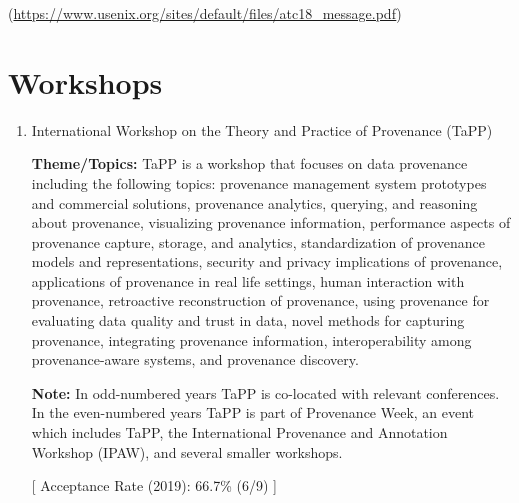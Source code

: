 \begin{enumerate}

(\url{https://www.usenix.org/sites/default/files/atc18_message.pdf})

\end{enumerate}

\section*{Workshops}
\begin{enumerate}[resume]
\tightlist
\item {International Workshop on the Theory and Practice of Provenance (TaPP)}

\textbf{Theme/Topics:} TaPP is a workshop that focuses on data provenance including the following topics: provenance management system prototypes and commercial solutions, provenance analytics, querying, and reasoning about provenance, visualizing provenance information, performance aspects of provenance capture, storage, and analytics, standardization of provenance models and representations, security and privacy implications of provenance, applications of provenance in real life settings, human interaction with provenance, retroactive reconstruction of provenance, using provenance for evaluating data quality and trust in data, novel methods for capturing provenance, integrating provenance information, interoperability among provenance-aware systems, and provenance discovery.

\textbf{Note:} In odd-numbered years TaPP is co-located with relevant conferences. In the even-numbered years TaPP is part of Provenance Week, an event which includes TaPP, the International Provenance and Annotation Workshop (IPAW), and several smaller workshops.

[ Acceptance Rate (2019): 66.7\% (6/9) ]

\end{enumerate}